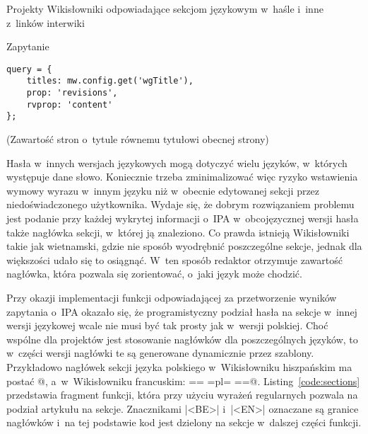 \begin{opis}
\item[Projekty] Wikisłowniki odpowiadające sekcjom językowym w~haśle i~inne z~linków interwiki
\item[Zapytanie]
\begin{verbatim}
query = {
    titles: mw.config.get('wgTitle'),
    prop: 'revisions',
    rvprop: 'content'
};
\end{verbatim}
(Zawartość stron o~tytule równemu tytułowi obecnej strony)
\end{opis}

Hasła w~innych wersjach językowych mogą dotyczyć wielu języków, w~których występuje dane słowo. Koniecznie trzeba zminimalizować więc ryzyko wstawienia wymowy wyrazu w~innym języku niż w~obecnie edytowanej sekcji przez niedoświadczonego użytkownika. Wydaje się, że dobrym rozwiązaniem problemu jest podanie przy każdej wykrytej informacji o~IPA w~obcojęzycznej wersji hasła także nagłówka sekcji, w~której ją znaleziono. Co prawda istnieją Wikisłowniki takie jak wietnamski, gdzie nie sposób wyodrębnić poszczególne sekcje, jednak dla większości udało się to osiągnąć. W~ten sposób redaktor otrzymuje zawartość nagłówka, która pozwala się zorientować, o~jaki język może chodzić.

Przy okazji implementacji funkcji odpowiadającej za przetworzenie wyników zapytania o~IPA okazało się, że programistyczny podział hasła na sekcje w~innej wersji językowej wcale nie musi być tak prosty jak w~wersji polskiej. Choć wspólne dla projektów jest stosowanie nagłówków dla poszczególnych języków, to w~części wersji nagłówki te są generowane dynamicznie przez szablony. Przykładowo nagłówek sekcji języka polskiego w~Wikisłowniku hiszpańskim ma postać @, a~w~Wikisłowniku francuskim: \kod@== {{=pl=}} ==@. Listing~\ref{code:sections} przedstawia fragment funkcji, która przy użyciu wyrażeń regularnych pozwala na podział artykułu na sekcje. Znacznikami \kod|<BE>| i~\kod|<EN>| oznaczane są granice nagłówków i~na tej podstawie kod jest dzielony na sekcje w~dalszej części funkcji.

